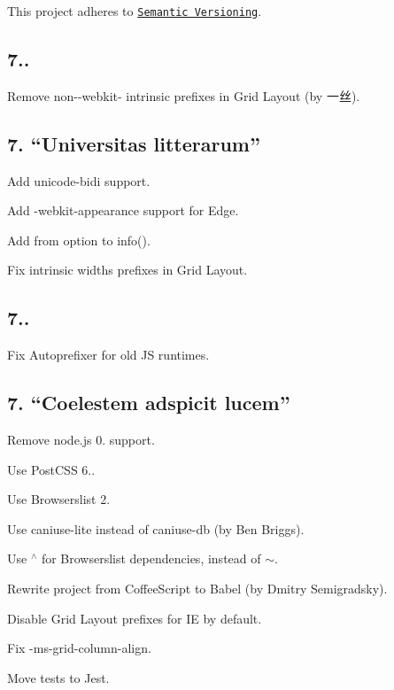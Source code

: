 This project adheres to \href{http://semver.org/}{\tt Semantic Versioning}.

\subsection*{7..}


\begin{DoxyItemize}
\item Remove non-\/{\ttfamily -\/webkit-\/} intrinsic prefixes in Grid Layout (by 一丝).
\end{DoxyItemize}

\subsection*{7. “\+Universitas litterarum”}


\begin{DoxyItemize}
\item Add {\ttfamily unicode-\/bidi} support.
\item Add {\ttfamily -\/webkit-\/appearance} support for Edge.
\item Add {\ttfamily from} option to {\ttfamily info()}.
\item Fix intrinsic widths prefixes in Grid Layout.
\end{DoxyItemize}

\subsection*{7..}


\begin{DoxyItemize}
\item Fix Autoprefixer for old JS runtimes.
\end{DoxyItemize}

\subsection*{7. “\+Coelestem adspicit lucem”}


\begin{DoxyItemize}
\item Remove node.\+js 0. support.
\item Use Post\+C\+SS 6..
\item Use Browserslist 2.
\item Use {\ttfamily caniuse-\/lite} instead of {\ttfamily caniuse-\/db} (by Ben Briggs).
\item Use {\ttfamily $^\wedge$} for Browserslist dependencies, instead of {\ttfamily $\sim$}.
\item Rewrite project from Coffee\+Script to Babel (by Dmitry Semigradsky).
\item Disable Grid Layout prefixes for IE by default.
\item Fix {\ttfamily -\/ms-\/grid-\/column-\/align}.
\item Move tests to Jest.
\end{DoxyItemize}


